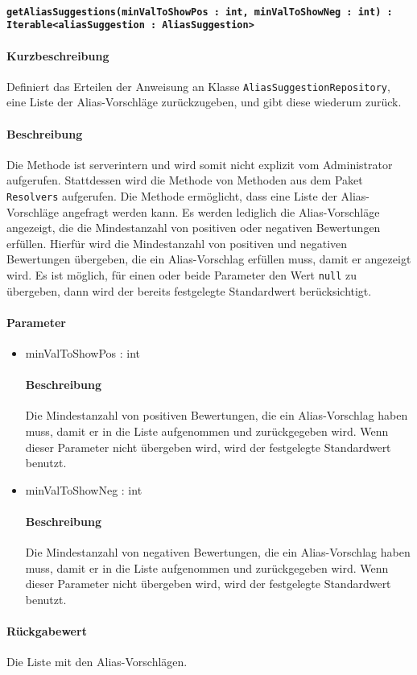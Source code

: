 \paragraph*{\texttt{getAliasSuggestions(minValToShowPos : int, minValToShowNeg : int) : Iterable<aliasSuggestion : AliasSuggestion>}}%
\paragraph*{Kurzbeschreibung}
Definiert das Erteilen der Anweisung an Klasse \texttt{AliasSuggestionRepository}, eine Liste der Alias-Vorschläge zurückzugeben, und gibt diese wiederum zurück.
\paragraph*{Beschreibung}
Die Methode ist serverintern und wird somit nicht explizit vom Administrator aufgerufen.
Stattdessen wird die Methode von Methoden aus dem Paket \texttt{Resolvers} aufgerufen.
Die Methode ermöglicht, dass eine Liste der Alias-Vorschläge angefragt werden kann.
Es werden lediglich die Alias-Vorschläge angezeigt, die die Mindestanzahl von positiven oder negativen Bewertungen erfüllen.
Hierfür wird die Mindestanzahl von positiven und negativen Bewertungen übergeben, die ein Alias-Vorschlag erfüllen muss, damit er angezeigt wird.
Es ist möglich, für einen oder beide Parameter den Wert \texttt{null} zu übergeben, dann wird der bereits festgelegte Standardwert berücksichtigt.
\paragraph*{Parameter}
\begin{itemize}
	\item minValToShowPos : int
		\paragraph*{Beschreibung}
		Die Mindestanzahl von positiven Bewertungen, die ein Alias-Vorschlag haben muss, damit er in die Liste aufgenommen und zurückgegeben wird.
		Wenn dieser Parameter nicht übergeben wird, wird der festgelegte Standardwert benutzt.
	\item minValToShowNeg : int
		\paragraph*{Beschreibung}
		Die Mindestanzahl von negativen Bewertungen, die ein Alias-Vorschlag haben muss, damit er in die Liste aufgenommen und zurückgegeben wird. 
		Wenn dieser Parameter nicht übergeben wird, wird der festgelegte Standardwert benutzt.
\end{itemize}
\paragraph*{Rückgabewert}
Die Liste mit den Alias-Vorschlägen. 
